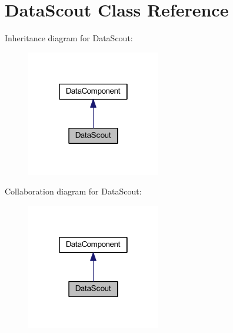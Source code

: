 \hypertarget{classhamburgscleanest_1_1_data_tables_1_1_models_1_1_data_components_1_1_data_scout}{}\section{Data\+Scout Class Reference}
\label{classhamburgscleanest_1_1_data_tables_1_1_models_1_1_data_components_1_1_data_scout}


Inheritance diagram for Data\+Scout\+:\nopagebreak
\begin{figure}[H]
\begin{center}
\leavevmode
\includegraphics[width=166pt]{classhamburgscleanest_1_1_data_tables_1_1_models_1_1_data_components_1_1_data_scout__inherit__graph}
\end{center}
\end{figure}


Collaboration diagram for Data\+Scout\+:\nopagebreak
\begin{figure}[H]
\begin{center}
\leavevmode
\includegraphics[width=166pt]{classhamburgscleanest_1_1_data_tables_1_1_models_1_1_data_components_1_1_data_scout__coll__graph}
\end{center}
\end{figure}
